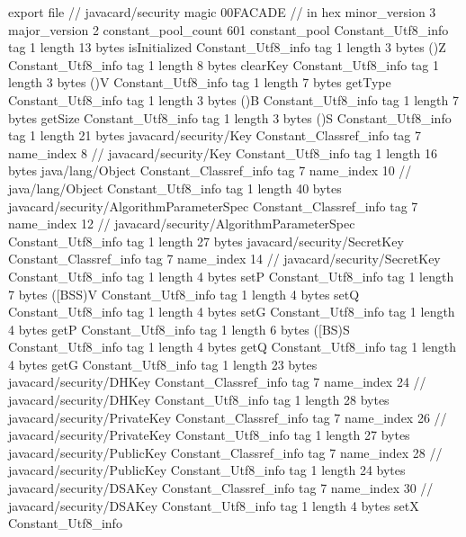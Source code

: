 export file {		// javacard/security
	magic	00FACADE		 // in hex
	minor_version	3
	major_version	2
	constant_pool_count	601
	constant_pool {
		Constant_Utf8_info {
			tag	1
			length	13
			bytes	isInitialized
		}
		Constant_Utf8_info {
			tag	1
			length	3
			bytes	()Z
		}
		Constant_Utf8_info {
			tag	1
			length	8
			bytes	clearKey
		}
		Constant_Utf8_info {
			tag	1
			length	3
			bytes	()V
		}
		Constant_Utf8_info {
			tag	1
			length	7
			bytes	getType
		}
		Constant_Utf8_info {
			tag	1
			length	3
			bytes	()B
		}
		Constant_Utf8_info {
			tag	1
			length	7
			bytes	getSize
		}
		Constant_Utf8_info {
			tag	1
			length	3
			bytes	()S
		}
		Constant_Utf8_info {
			tag	1
			length	21
			bytes	javacard/security/Key
		}
		Constant_Classref_info {
			tag	7
			name_index	8		// javacard/security/Key
		}
		Constant_Utf8_info {
			tag	1
			length	16
			bytes	java/lang/Object
		}
		Constant_Classref_info {
			tag	7
			name_index	10		// java/lang/Object
		}
		Constant_Utf8_info {
			tag	1
			length	40
			bytes	javacard/security/AlgorithmParameterSpec
		}
		Constant_Classref_info {
			tag	7
			name_index	12		// javacard/security/AlgorithmParameterSpec
		}
		Constant_Utf8_info {
			tag	1
			length	27
			bytes	javacard/security/SecretKey
		}
		Constant_Classref_info {
			tag	7
			name_index	14		// javacard/security/SecretKey
		}
		Constant_Utf8_info {
			tag	1
			length	4
			bytes	setP
		}
		Constant_Utf8_info {
			tag	1
			length	7
			bytes	([BSS)V
		}
		Constant_Utf8_info {
			tag	1
			length	4
			bytes	setQ
		}
		Constant_Utf8_info {
			tag	1
			length	4
			bytes	setG
		}
		Constant_Utf8_info {
			tag	1
			length	4
			bytes	getP
		}
		Constant_Utf8_info {
			tag	1
			length	6
			bytes	([BS)S
		}
		Constant_Utf8_info {
			tag	1
			length	4
			bytes	getQ
		}
		Constant_Utf8_info {
			tag	1
			length	4
			bytes	getG
		}
		Constant_Utf8_info {
			tag	1
			length	23
			bytes	javacard/security/DHKey
		}
		Constant_Classref_info {
			tag	7
			name_index	24		// javacard/security/DHKey
		}
		Constant_Utf8_info {
			tag	1
			length	28
			bytes	javacard/security/PrivateKey
		}
		Constant_Classref_info {
			tag	7
			name_index	26		// javacard/security/PrivateKey
		}
		Constant_Utf8_info {
			tag	1
			length	27
			bytes	javacard/security/PublicKey
		}
		Constant_Classref_info {
			tag	7
			name_index	28		// javacard/security/PublicKey
		}
		Constant_Utf8_info {
			tag	1
			length	24
			bytes	javacard/security/DSAKey
		}
		Constant_Classref_info {
			tag	7
			name_index	30		// javacard/security/DSAKey
		}
		Constant_Utf8_info {
			tag	1
			length	4
			bytes	setX
		}
		Constant_Utf8_info {
}}}
